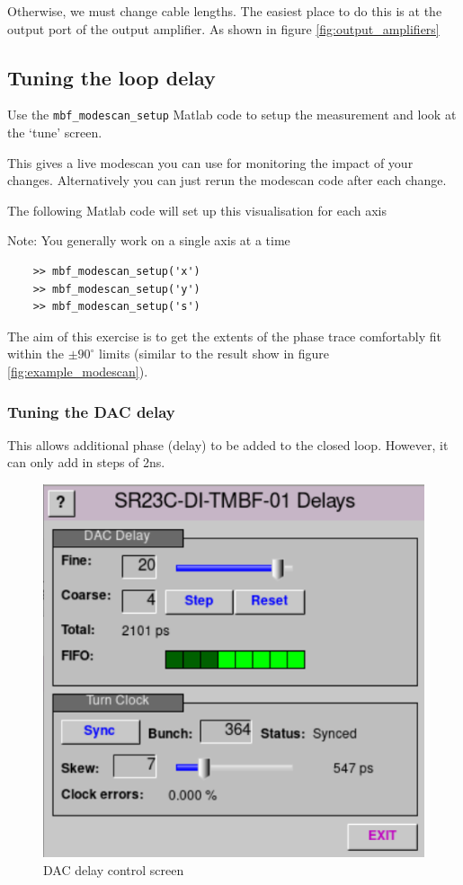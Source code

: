 \documentclass{report}
\begin{document}
Otherwise, we must change cable lengths. The easiest place to do this is at the output port of the output amplifier. As shown in figure \ref{fig:output_amplifiers}
\clearpage
\subsection{Tuning the loop delay} 

Use the \verb+mbf_modescan_setup+ Matlab code to setup the measurement and look at the ‘tune’ screen. 

This gives a live modescan you can use for monitoring the impact of your changes. Alternatively you can just rerun the modescan code after each change.

The following Matlab code will set up this visualisation for each axis 

Note: You generally work on a single axis at a time 

\begin{verbatim}
    >> mbf_modescan_setup('x') 
    >> mbf_modescan_setup('y') 
    >> mbf_modescan_setup('s') 
\end{verbatim}
 
The aim of this exercise is to get the extents of the phase trace comfortably fit within the $\pm90^\circ$ limits (similar to the result show in figure \ref{fig:example_modescan}). 

\subsubsection{Tuning the DAC delay} 
This allows additional phase (delay) to be added to the closed loop. However, it can only add in steps of 2ns.
\begin{figure}[h]
    \centering
    \includegraphics[width=0.5\linewidth]{DAC_delay.png}
    \caption{DAC delay control screen}
    \label{fig:DAC_delay_screen}
\end{figure}
\end{document}
